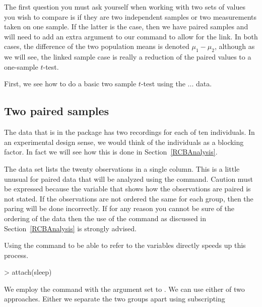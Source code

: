 The first question you must ask yourself when working with two sets of values you wish to compare is if they are two independent samples or two measurements taken on one sample. If the latter is the case, then we have paired samples and will need to add an extra argument to our command to allow for the link. In both cases, the difference of the two population means is denoted $\mu_1-\mu_2$, although as we will see, the linked sample case is really a reduction of the paired values to a one-sample $t$-test.  
 
First, we see how to do a basic two sample $t$-test using the ... data. 

 
\subsection{Two paired samples} 
\label{PairedSamplesTTest} 
 
The  data that is in the  package has two recordings for each of ten individuals. In an experimental design sense, we would think of the individuals as a blocking factor. In fact we will see how this is done in Section~\ref{RCBAnalysis}. 
 
The data set lists the twenty observations in a single column. This is a little unusual for paired data that will be analyzed using the  command. Caution must be expressed because the variable that shows how the observations are paired is not stated. If the observations are not ordered the same for each group, then the paring will be done incorrectly. If for any reason you cannot be sure of the ordering of the data then the use of the  command as discussed in Section~\ref{RCBAnalysis} is strongly advised. 
 
Using the  command to be able to refer to the variables directly speeds up this process. 

\begin{Schunk}
\begin{Sinput}
> attach(sleep) 
\end{Sinput}
\end{Schunk}

 
We employ the  command with the  argument set to . We can use either of two approaches. Either we separate the two groups apart using subscripting 

